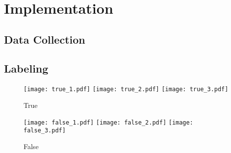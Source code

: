 \chapter{Implementation}\label{ch:implementation}

\section{Data Collection}

\section{Labeling}
\begin{figure}
    \centering
    \texttt{[image: true\_1.pdf]}
    \texttt{[image: true\_2.pdf]}
    \texttt{[image: true\_3.pdf]}
    \caption{True}
    \label{fig:label_true}
\end{figure}

\begin{figure}
    \centering
    \texttt{[image: false\_1.pdf]}
    \texttt{[image: false\_2.pdf]}
    \texttt{[image: false\_3.pdf]}
    \caption{False}
    \label{fig:label_true}
\end{figure}